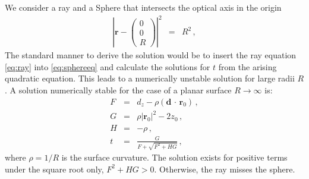 \documentclass[12pt,a4paper,twoside,openright,BCOR10mm,headsepline,titlepage,abstracton,chapterprefix,final]{scrreprt}
\newcommand\Vector[1]{{\mathbf{#1}}}
\newcommand\Location{\Vector{r}}
\newcommand{\scpm}[2]{(#1\,\cdot\,#2)}
\begin{document}
We consider a ray and a Sphere that intersects the optical axis in the origin
\begin{eqnarray}
 \left| \Location - \begin{pmatrix} 0 \\ 0 \\ R \end{pmatrix} \right|^2 &=& R^2\,, \label{eq:sphereeq}
\end{eqnarray}
The standard manner to derive the solution would be to insert the ray equation \eqref{eq:ray} into
\eqref{eq:sphereeq} and calculate the solutions for $t$ from the arising quadratic equation. This leads to a numerically unstable solution
for large radii $R$.
A solution numerically stable for the case of a planar surface $R \rightarrow \infty$ is:
\begin{subequations}
\label{eq:spheresolution}
\begin{eqnarray}
   F &=& d_z - \rho \scpm{\Vector{d}}{\Location_0}\,, \\
   G &=& \rho |\Location_0|^2 - 2 z_0\,, \\
   H &=& - \rho\,, \\
   t &=& \frac{G}{ F + \sqrt{F^2 + H G} }\,, \label{eq:tsolsphere}
\end{eqnarray}
\end{subequations}
where $\rho = 1 / R$ is the surface curvature. 
The solution exists for positive terms under the square root only, $F^2 + H G > 0$. 
Otherwise, the ray misses the sphere.
\end{document}
